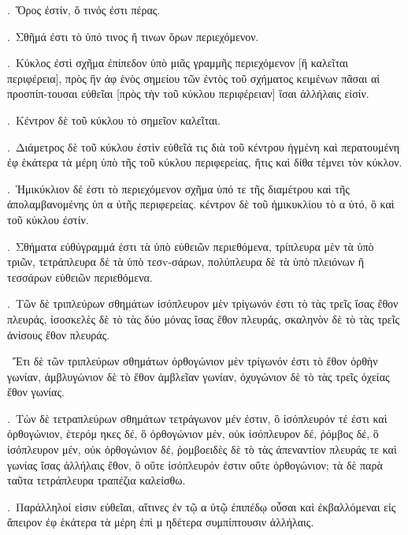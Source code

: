 \begin{Parallel}{}{}
{.~{\greekfont Ὅρος ἐστίν, ὅ τινός ἐστι πέρας.}

.~{\greekfont Σθῆμά ἐστι τὸ ὑπό τινος ἤ τινων ὅρων περιεχόμενον.}

.~{\greekfont Κύκλος ἐστὶ σχῆμα ἐπίπεδον ὑπὸ μιᾶς γραμμῆς περιεχόμενον [ἣ καλεῖται περιφέρεια], πρὸς ἣν ἀφ ἑνὸς σημείου
τῶν ἐντὸς τοῦ σχήματος κειμένων πᾶσαι αἱ προσπίπ-τουσαι εὐθεῖαι
[πρὸς τὴν τοῦ κύκλου περιφέρειαν] ἴσαι ἀλλήλαις εἰσίν.}

.~{\greekfont Κέντρον δὲ τοῦ κύκλου τὸ σημεῖον καλεῖται.}

.~{\greekfont Διάμετρος δὲ τοῦ κύκλου ἐστὶν εὐθεῖά τις διὰ τοῦ κέντρου
ἠγμένη καὶ περατουμένη ἐφ ἑκάτερα τὰ μέρη ὑπὸ τῆς τοῦ κύκλου περιφερείας, ἥτις καὶ δίθα τέμνει τὸν κύκλον.}

.~{\greekfont Ἡμικύκλιον δέ ἐστι τὸ περιεχόμενον σχῆμα ὑπό τε τῆς διαμέτρου καὶ τῆς ἀπολαμβανομένης ὑπ α ὐτῆς περιφερείας. κέντρον δὲ τοῦ ἡμικυκλίου τὸ α ὐτό, ὃ καὶ τοῦ κύκλου ἐστίν.}

.~{\greekfont Σθήματα εὐθύγραμμά ἐστι τὰ ὑπὸ εὐθειῶν περιεθόμενα,
τρίπλευρα μὲν τὰ ὑπὸ τριῶν, τετράπλευρα
δὲ τὰ ὑπὸ τεσv-σάρων, πολύπλευρα δὲ τὰ ὑπὸ πλειόνων ἢ τεσσάρων
εὐθειῶν περιεθόμενα.}

.~{\greekfont Τῶν δὲ τριπλεύρων σθημάτων ἰσόπλευρον μὲν τρίγωνόν ἐστι τὸ
τὰς τρεῖς ἴσας ἔθον πλευράς, ἰσοσκελὲς δὲ τὸ τὰς δύο μόνας ἴσας
ἔθον πλευράς, σκαληνὸν δὲ τὸ τὰς τρεῖς ἀνίσους ἔθον πλευράς.}

~{\greekfont Ἔτι δὲ τῶν τριπλεύρων σθημάτων ὀρθογώνιον μὲν τρίγωνόν ἐστι τὸ ἔθον ὀρθὴν γωνίαν,  ἀμβλυγώνιον δὲ τὸ ἔθον ἀμβλεῖαν
γωνίαν, ὀχυγώνιον δὲ τὸ τὰς τρεῖς ὀχείας ἔθον γωνίας.}

.~{\greekfont Τὼν δὲ τετραπλεύρων σθημάτων τετράγωνον μέν ἐστιν, ὃ 
ἰσόπλευρόν τέ ἐστι καὶ ὀρθογώνιον, ἑτερόμ ηκες δέ, ὃ
ὀρθογώνιον μέν, οὐκ ἰσόπλευρον δέ, ῥόμβος δέ, ὃ ἰσόπλευρον
μέν, οὐκ
ὀρθογώνιον δέ, ῥομβοειδὲς δὲ τὸ τὰς ἀπεναντίον πλευράς τε καὶ γωνίας ἴσας ἀλλήλαις ἔθον, ὃ οὔτε
ἰσόπλευρόν ἐστιν οὔτε ὀρθογώνιον; τὰ δὲ παρὰ ταῦτα τετράπλευρα
τραπέζια καλείσθω.}

.~{\greekfont Παράλληλοί εἰσιν εὐθεῖαι, αἵτινες ἐν τῷ α ὐτῷ ἐπιπέδῳ
οὖσαι καὶ ἐκβαλλόμεναι εἰς ἄπειρον ἐφ ἑκάτερα τὰ μέρη
ἐπὶ μ ηδέτερα  συμπίπτουσιν ἀλλήλαις.}}

\end{Parallel}

